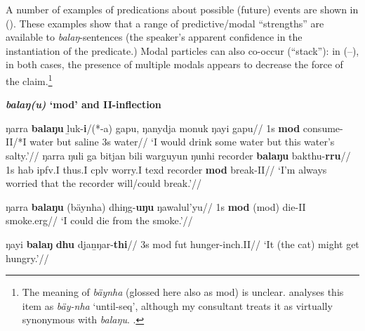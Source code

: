 A number of examples of predications about possible (future) events are shown in (\nextx). These examples show that a range of predictive/modal ``strengths'' are available to \textit{balaŋ}-sentences (the speaker's apparent confidence in the instantiation of the predicate.) Modal particles can also co-occur (``stack''): in (--), in both cases, the presence of multiple modals appears to decrease the force of the claim.\footnote{The meaning of \textit{bäynha} (glossed here also as \gls{mod}) is unclear. \citet[670]{Wilkinson1991} analyses this item as \textit{bäy-nha} `until-\gls{seq}', although my consultant treats it as virtually synonymous with \textit{balaŋu}.
\citet[See also][164]{Buchanan1978}.}

\pex \textbf{\textit{balaŋ(u)} `\gls{mod}' and \gls{II}-inflection}

\a\begingl\gla ŋarra \textbf{balaŋu} ḻuk-\textbf{i}/(*-a) gapu, ŋanydja monuk ŋayi gapu//
\glb 1s \textbf{\gls{mod}} consume-\gls{II}/*\gls{I} water but saline 3s water//
\glft`I would drink some water but this water's salty.'\trailingcitation{[DhG~20190405]}//\endgl
\a\begingl\gla ŋarra ŋuli ga bitjan bili warguyun ŋunhi \textup{recorder} \textbf{balaŋu} bakthu-\textbf{rru}//
\glb 1s \gls{hab} \gls{ipfv}.\gls{I} thus.\gls{I} \gls{cplv} worry.\gls{I} \gls{texd} recorder \textbf{\gls{mod}} break-\gls{II}// 
\glft`I'm always worried that the recorder will/could break.'\trailingcitation{[DhG~20190417]}//\endgl

\a\begingl\gla ŋarra \textbf{balaŋu} (bäynha) dhiŋg-\textbf{uŋu} ŋawalul'yu//
\glb 1s \textbf{\gls{mod}} (\gls{mod}) die-\gls{II} smoke.\gls{erg}//
\glft`I could die from the smoke.'\trailingcitation{[DhG~20190405]}//\endgl

\a\begingl\gla ŋayi \textbf{balaŋ} \textbf{dhu} djaṉŋar-\textbf{thi}//
\glb 3s \gls{mod} \gls{fut} hunger-\gls{inch}.\gls{II}//
\glft`It (the cat) might get hungry.'\trailingcitation{[AW~20190429]}//\endgl



